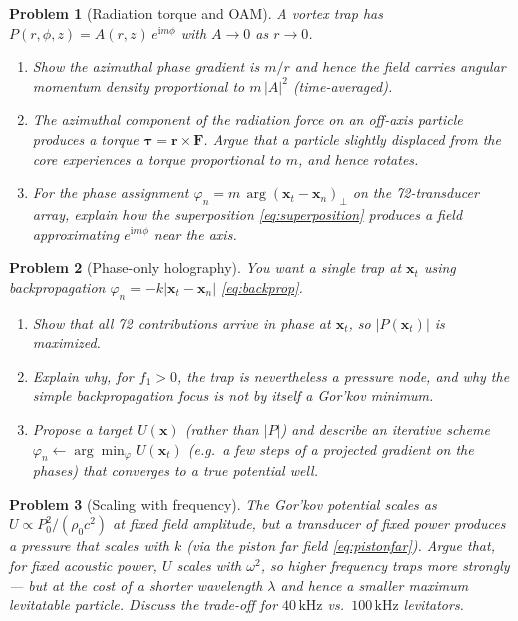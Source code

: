 \documentclass[11pt]{article}
\newtheorem{problem}{Problem}[section]
\newcommand{\rrho}{\rho_{0}}
\newcommand{\ii}{\mathrm{i}}
\newcommand{\xx}{\mathbf{x}}
\begin{document}
\begin{problem}[Radiation torque and OAM]\label{prob:torque}
A vortex trap has $P(r,\phi,z)=A(r,z)\,e^{\ii m\phi}$ with $A\to0$ as $r\to0$.
\begin{enumerate}[label=(\alph*)]
  \item Show the azimuthal phase gradient is $m/r$ and hence the field carries
  angular momentum density proportional to $m\,|A|^2$ (time-averaged).
  \item The azimuthal component of the radiation force on an off-axis particle
  produces a torque $\boldsymbol{\tau}=\mathbf{r}\times\mathbf{F}$. Argue that
  a particle slightly displaced from the core experiences a torque proportional
  to $m$, and hence rotates.
  \item For the phase assignment $\varphi_n=m\,\arg(\xx_t-\xx_n)_\perp$ on the
  72-transducer array, explain how the superposition \eqref{eq:superposition}
  produces a field approximating $e^{\ii m\phi}$ near the axis.
\end{enumerate}
\end{problem}

\begin{problem}[Phase-only holography]\label{prob:holography}
You want a single trap at $\xx_t$ using backpropagation
$\varphi_n=-k|\xx_t-\xx_n|$ \eqref{eq:backprop}.
\begin{enumerate}[label=(\alph*)]
  \item Show that all 72 contributions arrive in phase at $\xx_t$, so
  $|P(\xx_t)|$ is maximized.
  \item Explain why, for $f_1>0$, the \emph{trap} is nevertheless a pressure
  \emph{node}, and why the simple backpropagation focus is not by itself a
  Gor'kov minimum.
  \item Propose a target $U(\xx)$ (rather than $|P|$) and describe an iterative
  scheme $\varphi_n\leftarrow\arg\min_\varphi U(\xx_t)$ (e.g.\ a few steps of a
  projected gradient on the phases) that converges to a true potential well.
\end{enumerate}
\end{problem}

\begin{problem}[Scaling with frequency]\label{prob:scaling}
The Gor'kov potential scales as $U\propto P_0^2/(\rrho c^2)$ at fixed field
amplitude, but a transducer of fixed power produces a pressure that scales with
$k$ (via the piston far field \eqref{eq:pistonfar}). Argue that, for fixed
acoustic \emph{power}, $U$ scales with $\omega^2$, so higher frequency traps
more strongly --- but at the cost of a shorter wavelength $\lambda$ and hence a
smaller maximum levitatable particle. Discuss the trade-off for
$40\,\mathrm{kHz}$ vs.\ $100\,\mathrm{kHz}$ levitators.
\end{problem}
\end{document}
